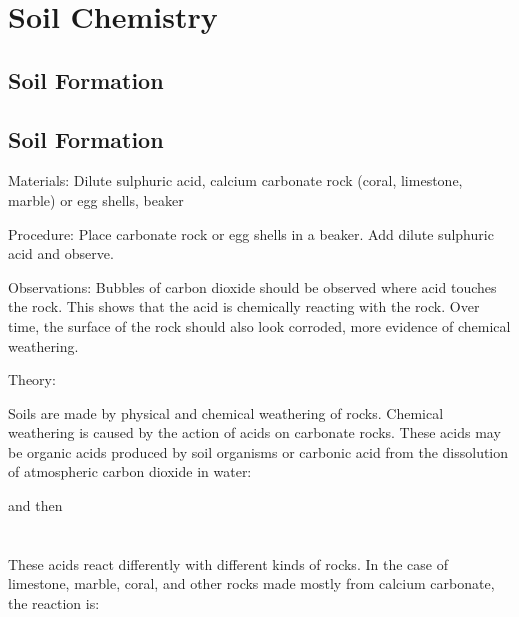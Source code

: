 \section{Soil Chemistry}

\begin{multicols}{2}


\section*{Soil Formation}


\subsection{Soil Formation}


\begin{description*}
\item[Materials:]{Dilute sulphuric acid, calcium carbonate rock (coral, limestone, marble) or egg shells, beaker}
\item[Procedure:]{Place carbonate rock or egg shells in a beaker. Add dilute sulphuric acid and observe.}
\item[Observations:]{Bubbles of carbon dioxide should be observed where acid touches the rock. This shows that the acid is chemically reacting with the rock. Over time, the surface of the rock should also look corroded, more evidence of chemical weathering.}
\item[Theory:]{
\raggedright Soils are made by physical and chemical weathering of rocks. Chemical weathering is caused by the action of acids on carbonate rocks. These acids may be organic acids produced by soil organisms or carbonic acid from the dissolution of atmospheric carbon dioxide in water:\\
\begin{center}
\end{center}
and then\\
\vspace{6pt}
\\
\\
\vspace{6pt}
These acids react differently with different kinds of rocks. In the case of limestone, marble, coral, and other rocks made mostly from calcium carbonate, the reaction is:\\

}
\end{description*}
\end{multicols}
